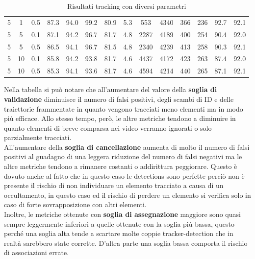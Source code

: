 \begin{table}[h!]
\begin{tabular}{|c|c|c|c|c|c|c|c|c|c|c|c|c|c|}
5 & 1 & 0.5 & 87.3 & 94.0 & 99.2 & 80.9 & 5.3 & 553 & 4340 & 366 & 236 & 92.7 & 92.1\\
5 & 5 & 0.1 & 87.1 & 94.2 & 96.7 & 81.7 & 4.8 & 2287 & 4189 & 400 & 254 & 90.4 & 92.0\\
5 & 5 & 0.5 & 86.5 & 94.1 & 96.7 & 81.5 & 4.8 & 2340 & 4239 & 413 & 258 & 90.3 & 92.1\\
5 & 10 & 0.1 & 85.8 & 94.2 & 93.8 & 81.7 & 4.6 & 4437 & 4172 & 423 & 263 & 87.4 & 92.0\\
5 & 10 & 0.5 & 85.3 & 94.1 & 93.6 & 81.7 & 4.6 & 4594 & 4214 & 440 & 265 & 87.1 & 92.1\\
\hline
\end{tabular}
\caption{Risultati tracking con diversi parametri}
\label{risultati tracking con diversi parametri}
\end{table}

Nella tabella si può notare che all'aumentare del valore della \textbf{soglia di validazione} diminuisce il numero di falsi positivi, degli scambi di ID e delle traiettorie frammentate in quanto vengono tracciati meno elementi ma in modo più efficace. Allo stesso tempo, però, le altre metriche tendono a diminuire in quanto elementi di breve comparsa nei video verranno ignorati o solo parzialmente tracciati.\\
All'aumentare della \textbf{soglia di cancellazione} aumenta di molto il numero di falsi positivi al guadagno di una leggera riduzione del numero di falsi negativi ma le altre metriche tendono a rimanere costanti o addirittura peggiorare. Questo è dovuto anche al fatto che in questo caso le detections sono perfette perciò non è presente il rischio di non individuare un elemento tracciato a causa di un occultamento, in questo caso ed il rischio di perdere un elemento si verifica solo in caso di forte sovrapposizione con altri elementi.\\
Inoltre, le metriche ottenute con \textbf{soglia di assegnazione} maggiore sono quasi sempre leggermente inferiori a quelle ottenute con la soglia più bassa, questo perché una soglia alta tende a scartare molte coppie tracker-detection che in realtà sarebbero state corrette. D'altra parte una soglia bassa comporta il rischio di associazioni errate.

\clearpage

